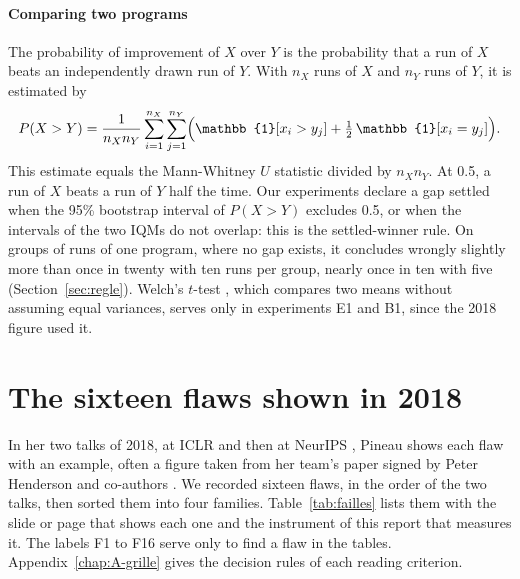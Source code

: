 \paragraph{Comparing two programs}
The probability of improvement of $X$ over $Y$ is the probability that a run of $X$ beats an
independently drawn run of $Y$. With $n_X$ runs of $X$ and $n_Y$ runs of $Y$, it is estimated by
\begin{equation}
  P(X > Y) = \frac{1}{n_X n_Y} \sum_{i=1}^{n_X} \sum_{j=1}^{n_Y} \Bigl( \mathbb{1}[x_i > y_j] + \tfrac{1}{2}\, \mathbb{1}[x_i = y_j] \Bigr).
\end{equation}
This estimate equals the Mann-Whitney $U$ statistic divided by $n_X n_Y$. At 0.5, a run of $X$ beats a
run of $Y$ half the time. Our experiments declare a gap settled when the 95\% bootstrap interval of
$P(X > Y)$ excludes 0.5, or when the intervals of the two IQMs do not overlap: this is the
settled-winner rule. On groups of runs of one program, where no gap exists, it concludes wrongly slightly more than once in twenty with
ten runs per group, nearly once in ten with five (Section~\ref{sec:regle}). Welch's $t$-test \parencite{welch1947generalization}, which compares two
means without assuming equal variances, serves only in experiments E1 and B1, since the 2018 figure
used it.

\section{The sixteen flaws shown in 2018}\label{sec:failles}

In her two talks of 2018, at ICLR and then at NeurIPS \parencite{pineau2018iclr,pineau2018neurips},
Pineau shows each flaw with an example, often a figure taken from her team's paper signed by Peter
Henderson and co-authors \parencite{henderson2018matters}. We recorded sixteen flaws, in the order of
the two talks, then sorted them into four families. Table~\ref{tab:failles} lists them with the slide
or page that shows each one and the instrument of this report that measures it. The labels F1 to F16
serve only to find a flaw in the tables. Appendix~\ref{chap:A-grille} gives the decision rules of
each reading criterion.

